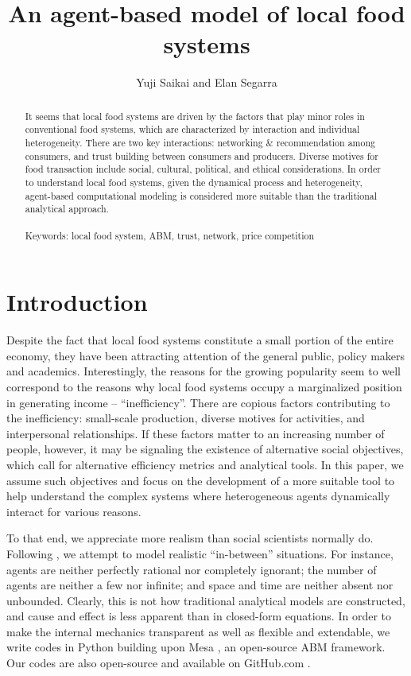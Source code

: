 \documentclass[11pt, oneside]{article}
\title{An agent-based model of local food systems}
\author{Yuji Saikai and Elan Segarra}
\begin{document}
\maketitle
\thispagestyle{empty} %
\vspace{5mm}

\begin{abstract}
\noindent 
It seems that local food systems are driven by the factors that play minor roles in conventional food systems, which are characterized by interaction and individual heterogeneity. There are two key interactions: networking \& recommendation among consumers, and trust building between consumers and producers. Diverse motives for food transaction include social, cultural, political, and ethical considerations. In order to understand local food systems, given the dynamical process and heterogeneity, agent-based computational modeling is considered more suitable than the traditional analytical approach.\\\\
\noindent
Keywords: local food system, ABM, trust, network, price competition
\end{abstract}

\pagebreak

\tableofcontents
\pagebreak

\section{Introduction}
Despite the fact that local food systems constitute a small portion of the entire economy, they have been attracting  attention of the general public, policy makers and academics. Interestingly, the reasons for the growing popularity seem to well correspond to the reasons why local food systems occupy a marginalized position in generating income -- ``inefficiency''. There are copious factors contributing to the inefficiency: small-scale production, diverse motives for activities, and interpersonal relationships. If these factors matter to an increasing number of people, however, it may be signaling the existence of alternative social objectives, which call for alternative efficiency metrics and analytical tools. In this paper, we assume such objectives and focus on the development of a more suitable tool to help understand the complex systems where heterogeneous agents dynamically interact for various reasons.

To that end, we appreciate more realism than social scientists normally do. Following \textcite{Miller2009}, we attempt to model realistic ``in-between'' situations. For instance, agents are neither perfectly rational nor completely ignorant; the number of agents are neither a few nor infinite; and space and time are neither absent nor unbounded. Clearly, this is not how traditional analytical models are constructed, and cause and effect is less apparent than in closed-form equations. In order to make the internal mechanics transparent as well as flexible and extendable, we write codes in Python building upon Mesa \parencite{Mesa2016}, an open-source ABM framework. Our codes are also open-source and available on GitHub.com \parencite{Saikai2016}.
\end{document}
